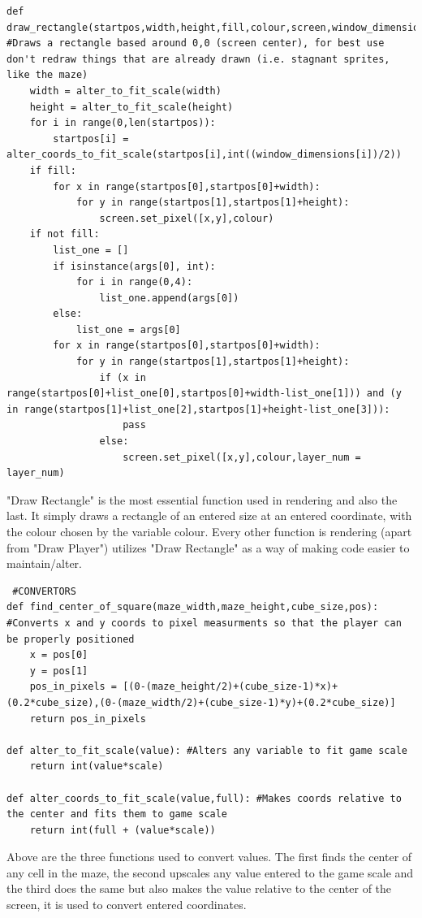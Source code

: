 \begin{lstlisting}
def draw_rectangle(startpos,width,height,fill,colour,screen,window_dimensions,layer_num,*args): #Draws a rectangle based around 0,0 (screen center), for best use don't redraw things that are already drawn (i.e. stagnant sprites, like the maze)
    width = alter_to_fit_scale(width)
    height = alter_to_fit_scale(height)
    for i in range(0,len(startpos)):
        startpos[i] = alter_coords_to_fit_scale(startpos[i],int((window_dimensions[i])/2))
    if fill:
        for x in range(startpos[0],startpos[0]+width):
            for y in range(startpos[1],startpos[1]+height):
                screen.set_pixel([x,y],colour)
    if not fill:
        list_one = []
        if isinstance(args[0], int):
            for i in range(0,4):
                list_one.append(args[0])
        else:
            list_one = args[0]
        for x in range(startpos[0],startpos[0]+width):
            for y in range(startpos[1],startpos[1]+height):
                if (x in range(startpos[0]+list_one[0],startpos[0]+width-list_one[1])) and (y in range(startpos[1]+list_one[2],startpos[1]+height-list_one[3])):
                    pass
                else:
                    screen.set_pixel([x,y],colour,layer_num = layer_num)
\end{lstlisting}
"Draw Rectangle" is the most essential function used in rendering and also the last. It simply draws a rectangle of an entered size at an entered coordinate, with the colour chosen by the variable colour. Every other function is rendering (apart from "Draw Player") utilizes "Draw Rectangle" as a way of making code easier to maintain/alter.
\clearpage
\begin{lstlisting}
 #CONVERTORS                    
def find_center_of_square(maze_width,maze_height,cube_size,pos): #Converts x and y coords to pixel measurments so that the player can be properly positioned 
    x = pos[0]                                                   
    y = pos[1]
    pos_in_pixels = [(0-(maze_height/2)+(cube_size-1)*x)+(0.2*cube_size),(0-(maze_width/2)+(cube_size-1)*y)+(0.2*cube_size)]
    return pos_in_pixels

def alter_to_fit_scale(value): #Alters any variable to fit game scale    
    return int(value*scale)

def alter_coords_to_fit_scale(value,full): #Makes coords relative to the center and fits them to game scale   
    return int(full + (value*scale))
\end{lstlisting}
Above are the three functions used to convert values. The first finds the center of any cell in the maze, the second upscales any value entered to the game scale and the third does the same but also makes the value relative to the center of the screen, it is used to convert entered coordinates.

